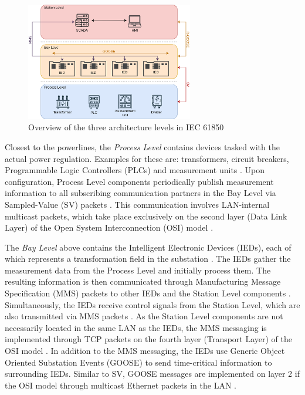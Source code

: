 \documentclass[conference, onecolumn, a4paper]{IEEEtran}
\begin{document}
\begin{figure}[h]
    \centering
    \includegraphics[width=0.65\textwidth]{images/IEC61850_Architecture.png}
    \caption{Overview of the three architecture levels in IEC 61850 \cite{SGRWin_IEC61850Architecture:2021}}
    \label{image:IEC61850Architecture}
\end{figure}

\noindent Closest to the powerlines, the \textit{Process Level} contains devices tasked with the actual power regulation. Examples for these are: transformers, 
circuit breakers, Programmable Logic Controllers (PLCs) and measurement units \cite{SGRWin_IEC61850Architecture:2021}. Upon configuration, Process Level 
components periodically publish measurement information to all subscribing communication partners in the Bay Level via Sampled-Value (SV) packets 
\cite{TyphoonHIL_IEC61850SV:2021}. This communication involves LAN-internal multicast packets, which take place exclusively on the second layer 
(Data Link Layer) of the Open System Interconnection (OSI) model \cite{TyphoonHIL_IEC61850SV:2021}. 

\smallskip
The \textit{Bay Level} above contains the Intelligent Electronic Devices (IEDs), each of which represents a transformation field in the substation 
\cite[p. 29]{IEC61850-7-1:2011}. The IEDs gather the measurement data from the Process Level and initially process them. The resulting information 
is then communicated through Manufacturing Message Specification (MMS) packets to other IEDs and the Station Level components \cite[p. 44]{IEC61850-8-1:2011}. 
Simultaneously, the IEDs receive control signals from the Station Level, which are also transmitted via MMS packets \cite{trafficGen_IEC61850:2011}. 
As the Station Level components are not necessarily located in the same LAN as the IEDs, the MMS messaging is implemented through TCP packets on the 
fourth layer (Transport Layer) of the OSI model \cite[p. 45]{IEC61850-8-1:2011}. In addition to the MMS messaging, the IEDs use Generic Object 
Oriented Substation Events (GOOSE) to send time-critical information to surrounding IEDs. Similar to SV, GOOSE messages are implemented on layer 2 if the OSI 
model through multicast Ethernet packets in the LAN \cite{GOOSE_confidentiality_integrity:2020}.
\end{document}
